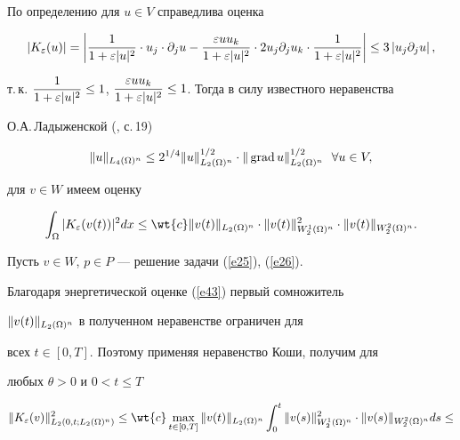 \begin{pf}


По определению для $u \in V$ справедлива оценка


$$


|K_{\eps}(u)|=\left|\frac {1}{1+\eps |u|^2}\cdot u_j\cdot


\partial_j u-\frac{\eps u u_k}{1+\eps |u|^2}\cdot 2u_j \partial_j u_k


\cdot \frac {1}{1+\eps |u|^2}\right| \le 3 \left|u_j


\partial_j u\right|,


$$


т.\,к. $\dfrac {1}{1+\eps |u|^2}\le 1$, $\dfrac{\eps u u_k}{1


+\eps |u|^2}\le 1$. Тогда в силу известного неравенства


О.А.\,Ладыженской (\cite{Lad}, с.\,19)


$$


\|u\|_{L_4(\Om)^n}\le 2^{1/4} \|u\|_{L_2(\Om)^n}^{1/2}\cdot


\|\grad u \|_{L_2(\Om)^n}^{1/2} \ \ \forall u \in V,


$$


для $v \in W$ имеем оценку


$$


\intl {\Om}{}|K_{\eps}(v(t))|^2 dx \le \wt{c}


\|v(t)\|_{L_2(\Om)^n}\cdot \|v(t)\|_{W_2^1(\Om)^n}^2 \cdot


\|v(t)\|_{W_2^2(\Om)^n}.


$$


Пусть $v \in W$, $p \in P$ --- решение задачи (\ref{e25}), (\ref{e26}).


Благодаря энергетической оценке (\ref{e43}) первый сомножитель


$\|v(t)\|_{L_2(\Omega)^n}$ в полученном неравенстве ограничен для


всех $t \in [0,T]$. Поэтому применяя неравенство Коши, получим для


любых $\theta>0$ и $0<t\le T$


\begin{multline*}


\|K_{\eps}(v)\|_{L_2(0,t;L_2(\Om)^n)}^2\le \wt{c} \maxl


{t \in [0,T]}\|v(t)\|_{L_2(\Om)^n} \intl 0 t


\|v(s)\|_{W_2^1(\Om)^n}^2


\cdot \|v(s)\|_{W_2^2(\Om)^n} ds \le \\



\end{multline*}
\end{pf}
